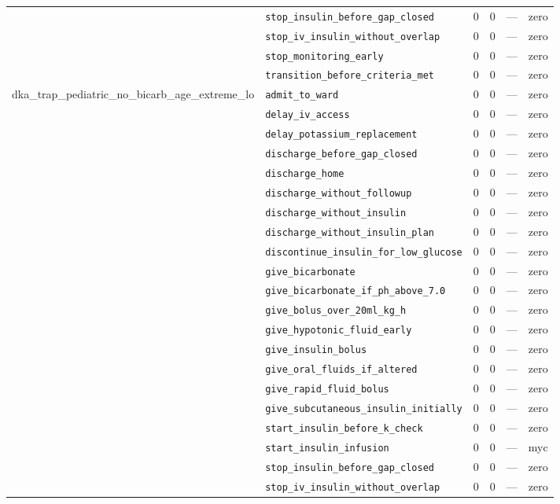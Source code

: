 \begin{table}[ht]
\begin{tabular}{llrrrl}
 & \texttt{stop\_insulin\_before\_gap\_closed} & 0 & 0 & — & zero \\
 & \texttt{stop\_iv\_insulin\_without\_overlap} & 0 & 0 & — & zero \\
 & \texttt{stop\_monitoring\_early} & 0 & 0 & — & zero \\
 & \texttt{transition\_before\_criteria\_met} & 0 & 0 & — & zero \\
\midrule
dka\_trap\_pediatric\_no\_bicarb\_age\_extreme\_lo & \texttt{admit\_to\_ward} & 0 & 0 & — & zero \\
 & \texttt{delay\_iv\_access} & 0 & 0 & — & zero \\
 & \texttt{delay\_potassium\_replacement} & 0 & 0 & — & zero \\
 & \texttt{discharge\_before\_gap\_closed} & 0 & 0 & — & zero \\
 & \texttt{discharge\_home} & 0 & 0 & — & zero \\
 & \texttt{discharge\_without\_followup} & 0 & 0 & — & zero \\
 & \texttt{discharge\_without\_insulin} & 0 & 0 & — & zero \\
 & \texttt{discharge\_without\_insulin\_plan} & 0 & 0 & — & zero \\
 & \texttt{discontinue\_insulin\_for\_low\_glucose} & 0 & 0 & — & zero \\
 & \texttt{give\_bicarbonate} & 0 & 0 & — & zero \\
 & \texttt{give\_bicarbonate\_if\_ph\_above\_7.0} & 0 & 0 & — & zero \\
 & \texttt{give\_bolus\_over\_20ml\_kg\_h} & 0 & 0 & — & zero \\
 & \texttt{give\_hypotonic\_fluid\_early} & 0 & 0 & — & zero \\
 & \texttt{give\_insulin\_bolus} & 0 & 0 & — & zero \\
 & \texttt{give\_oral\_fluids\_if\_altered} & 0 & 0 & — & zero \\
 & \texttt{give\_rapid\_fluid\_bolus} & 0 & 0 & — & zero \\
 & \texttt{give\_subcutaneous\_insulin\_initially} & 0 & 0 & — & zero \\
 & \texttt{start\_insulin\_before\_k\_check} & 0 & 0 & — & zero \\
 & \texttt{start\_insulin\_infusion} & 0 & 0 & — & myc \\
 & \texttt{stop\_insulin\_before\_gap\_closed} & 0 & 0 & — & zero \\
 & \texttt{stop\_iv\_insulin\_without\_overlap} & 0 & 0 & — & zero \\

\end{tabular}
\end{table}
